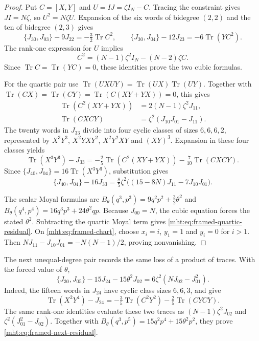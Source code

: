 \begin{proof}
Put $C=[X,Y]$ and $U=IJ=\zeta I_N-C$.
Tracing the constraint gives $JI=N\zeta$, so $U^2=N\zeta U$.
Expansion of the six words of bidegree $(2,2)$ and
the ten of bidegree $(2,3)$ gives
\[
 \{J_{30},J_{03}\}-9J_{22}=-\tfrac32\operatorname{Tr}C^2,
 \qquad
 \{J_{30},J_{04}\}-12J_{23}=-6\operatorname{Tr}(YC^2).
\]
The rank-one expression for $U$ implies
\[
 C^2=(N-1)\zeta^2I_N-(N-2)\zeta C.
\]
Since $\operatorname{Tr}C=\operatorname{Tr}(YC)=0$, these
identities prove the two cubic formulas.

For the quartic pair use
$\operatorname{Tr}(UXUY)=\operatorname{Tr}(UX)\operatorname{Tr}(UY)$.
Together with
$\operatorname{Tr}(CX)=\operatorname{Tr}(CY)=
 \operatorname{Tr}(C(XY+YX))=0$, this gives
\begin{align*}
 \operatorname{Tr}(C^2(XY+YX))&=2(N-1)\zeta^2J_{11},\\
 \operatorname{Tr}(CXCY)&=\zeta^2(J_{10}J_{01}-J_{11}).
\end{align*}
The twenty words in $J_{33}$ divide into four cyclic classes
of sizes $6,6,6,2$, represented by
$X^3Y^3$, $X^2YXY^2$, $X^2Y^2XY$ and $(XY)^3$.
Expansion in these four classes yields
\[
 \operatorname{Tr}(X^3Y^3)-J_{33}
 =-\tfrac25\operatorname{Tr}(C^2(XY+YX))
  -\tfrac7{10}\operatorname{Tr}(CXCY).
\]
Since $\{J_{40},J_{04}\}=16\operatorname{Tr}(X^3Y^3)$,
substitution gives
\[
 \{J_{40},J_{04}\}-16J_{33}
 =\tfrac85\zeta^2\bigl((15-8N)J_{11}-7J_{10}J_{01}\bigr).
\]

The scalar Moyal formulas are
$B_\theta(q^3,p^3)=9q^2p^2+\frac32\theta^2$ and
$B_\theta(q^4,p^4)=16q^3p^3+24\theta^2qp$.
Because $J_{00}=N$, the cubic equation forces the stated
$\theta^2$. Subtracting the quartic Moyal term gives
\eqref{mht:eq:framed-quartic-residual}.
On \eqref{mht:eq:framed-chart}, choose $x_i=i$,
$y_1=1$ and $y_i=0$ for $i>1$. Then
$NJ_{11}-J_{10}J_{01}=-N(N-1)/2$, proving nonvanishing.
\end{proof}

The next unequal-degree pair records the same loss of a
product of traces. With the forced value of $\theta$,
\begin{equation}\label{mht:eq:framed-next-residual}
 \{J_{30},J_{05}\}-15J_{24}-15\theta^2J_{02}
          =6\zeta^2(NJ_{02}-J_{01}^2).
\end{equation}
Indeed, the fifteen words in $J_{24}$ have cyclic class sizes
$6,6,3$, and give
\[
 \operatorname{Tr}(X^2Y^4)-J_{24}
 =-\tfrac35\operatorname{Tr}(C^2Y^2)
  -\tfrac25\operatorname{Tr}(CYCY).
\]
The same rank-one identities evaluate these two traces as
$(N-1)\zeta^2J_{02}$ and $\zeta^2(J_{01}^2-J_{02})$.
Together with $B_\theta(q^3,p^5)=15q^2p^4+15\theta^2p^2$,
they prove \eqref{mht:eq:framed-next-residual}.

